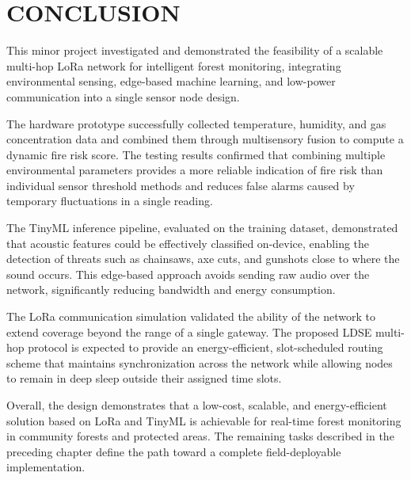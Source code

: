 \chapter{CONCLUSION}

This minor project investigated and demonstrated the feasibility of a scalable
multi-hop LoRa network for intelligent forest monitoring, integrating
environmental sensing, edge-based machine learning, and low-power
communication into a single sensor node design.

The hardware prototype successfully collected temperature, humidity, and gas
concentration data and combined them through multisensory fusion to compute a
dynamic fire risk score. The testing results confirmed that combining multiple
environmental parameters provides a more reliable indication of fire risk than
individual sensor threshold methods and reduces false alarms caused by
temporary fluctuations in a single reading.

The TinyML inference pipeline, evaluated on the training dataset, demonstrated
that acoustic features could be effectively classified on-device, enabling the
detection of threats such as chainsaws, axe cuts, and gunshots close to where
the sound occurs. This edge-based approach avoids sending raw audio over the
network, significantly reducing bandwidth and energy consumption.

The LoRa communication simulation validated the ability of the network to
extend coverage beyond the range of a single gateway. The proposed LDSE
multi-hop protocol is expected to provide an energy-efficient, slot-scheduled
routing scheme that maintains synchronization across the network while
allowing nodes to remain in deep sleep outside their assigned time slots.

Overall, the design demonstrates that a low-cost, scalable, and
energy-efficient solution based on LoRa and TinyML is achievable for real-time
forest monitoring in community forests and protected areas. The remaining
tasks described in the preceding chapter define the path toward a complete
field-deployable implementation.